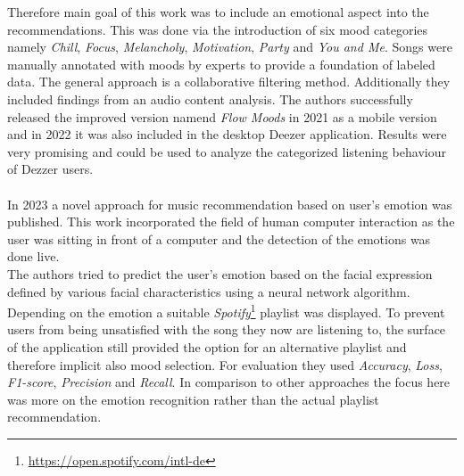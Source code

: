 \documentclass[runningheads,a4paper]{llncs}
\begin{document}
Therefore main goal of this work was to include an emotional aspect into the recommendations.
This was done via the introduction of six mood categories namely \textit{Chill}, \textit{Focus}, \textit{Melancholy}, \textit{Motivation}, \textit{Party} and \textit{You and Me}.
Songs were manually annotated with moods by experts to provide a foundation of labeled data. The general approach is a collaborative filtering method. Additionally they included findings from an audio content analysis.
The authors successfully released the improved version namend \textit{Flow Moods} in 2021 as a mobile version and in 2022 it was also included in the desktop Deezer application.
Results were very promising and could be used to analyze the categorized listening behaviour of Dezzer users. 
\cite{bontempelli2022flow}\\
\\
In 2023 a novel approach for music recommendation based on user's emotion was published. 
This work incorporated the field of human computer interaction as the user 
was sitting in front of a computer and the detection of the emotions was done live. \\
The authors tried to predict the user's emotion based on the facial expression defined by various facial characteristics using a neural network algorithm.\\
Depending on the emotion a suitable \textit{Spotify}\footnote{\url{https://open.spotify.com/intl-de}} playlist was displayed.
To prevent users from being unsatisfied with the song they now are listening to, the surface of the application still provided the option for an alternative playlist and therefore implicit also mood selection.
For evaluation they used \textit{Accuracy}, \textit{Loss}, \textit{F1-score}, \textit{Precision} and \textit{Recall}.
In comparison to other approaches the focus here was more on the emotion recognition rather than the actual playlist recommendation.\cite{priyanka2023novel}
\end{document}

